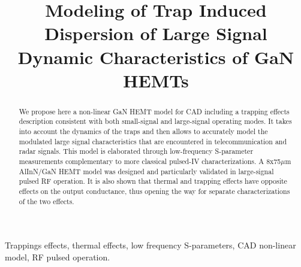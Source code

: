 \documentclass[conference]{IEEEtran}
\begin{document}
\title{\LARGE Modeling of Trap Induced Dispersion of Large Signal Dynamic Characteristics of GaN HEMTs}


 \author{
 }

\maketitle

\begin{abstract}
We propose here a non-linear GaN HEMT model for CAD including a trapping effects description consistent with both small-signal and large-signal operating modes. It takes into account the dynamics of the traps and then allows to accurately model the modulated large signal characteristics that are encountered in telecommunication and radar signals. This model is elaborated through low-frequency S-parameter measurements complementary to more classical pulsed-IV characterizations. A 8x75$\mu$m AlInN/GaN HEMT model was designed and particularly validated in large-signal pulsed RF operation. It is also shown that thermal and trapping effects have opposite effects on the output conductance, thus opening the way for separate characterizations of the two effects.
\end{abstract}

\IEEEoverridecommandlockouts
\begin{keywords}
Trappings effects, thermal effects, low frequency S-parameters, CAD non-linear model, RF pulsed operation.
\end{keywords}

\IEEEpeerreviewmaketitle
\end{document}
